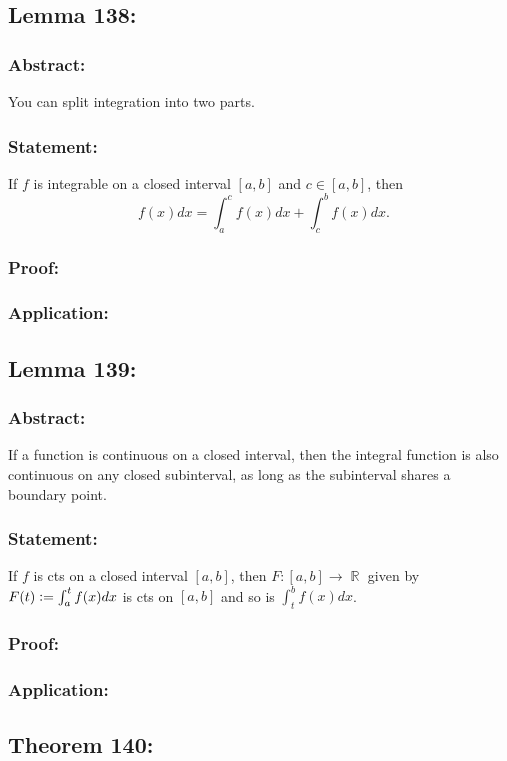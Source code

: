 \documentclass{article}
\DeclareMathOperator\R{\mathbb{R}}
\DeclareMathOperator\inti{\int_{a}^{b}}
\begin{document}
\subsection{Lemma 138:}
\subsubsection*{Abstract:}
You can split integration into two parts.
\subsubsection*{Statement:}
If $f$ is integrable on a closed interval $[a,b]$ and $c \in [a,b]$, then
$$
\inti f(x)dx = \int^c_a f(x)dx + \int^b_c f(x)dx.
$$
\subsubsection*{Proof:}

\subsubsection*{Application:}

\subsection{Lemma 139:}
\subsubsection*{Abstract:}
If a function is continuous on a closed interval, then the integral function
is also continuous on any closed subinterval, as long as the subinterval shares a boundary point.
\subsubsection*{Statement:}
If $f$ is cts on a closed interval $[a,b]$,
then $F:[a,b] \to \R$ given by $F(t) \vcentcolon= \int_a^t f(x)dx$ is cts on
$[a,b]$ and so is $\int_t^bf(x)dx$.
\subsubsection*{Proof:}

\subsubsection*{Application:}

\subsection{Theorem 140:}
\end{document}
